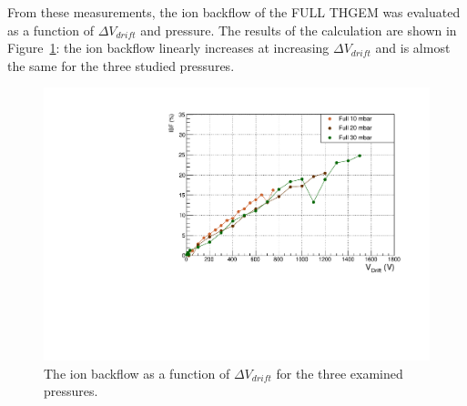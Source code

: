 \documentclass[a4paper, 11 pt]{article}
\newcommand{\Vind}{$\Delta V_{ind}$}
\newcommand{\Vthgem}{$\Delta V_{THGEM}$}
\newcommand{\Vdrift}{$ \Delta V_{drift}$}
\newcommand{\ibf}{$I_{bf}$}
\begin{document}
From these measurements, the ion backflow of the FULL THGEM was evaluated as a function of \Vdrift{} and pressure.
The results of the calculation are shown in Figure~\ref{fig:ion_backflow_FULL}: the ion backflow linearly increases at increasing \Vdrift{} and is almost the same for the three studied pressures.

\begin{figure}[htbp]
	\centering
	\includegraphics[width=\textwidth]{Immagini/IBFvsDrift_FULLonly.pdf}
	\caption{The ion backflow as a function of \Vdrift{} for the three examined pressures.}
	\label{fig:ion_backflow_FULL}
\end{figure}



\end{document}
